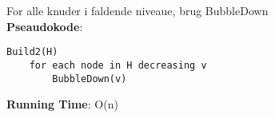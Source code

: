 For alle knuder i faldende niveaue, brug BubbleDown\\
\textbf{Pseaudokode}:
\begin{lstlisting}[frame=single, mathescape=true]
Build2(H)
	for each node in H decreasing v
		BubbleDown(v)
\end{lstlisting}
\textbf{Running Time}: O(n)